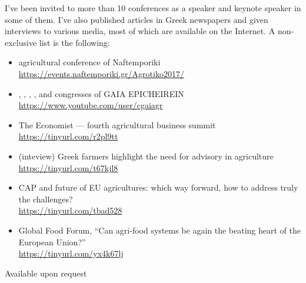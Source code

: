 \documentclass[10pt,a4paper]{article} %
\begin{document}
I've been invited to more than 10 conferences as a speaker and keynote speaker in some of them. I've also published
articles in Greek newspapers and given interviews to various media, most of which are available on the Internet.
A non-exclusive list is the following:
\begin{itemize}
\item {} agricultural conference of Naftemporiki \href{https://events.naftemporiki.gr/Agrotiko2017/}{https://events.naftemporiki.gr/Agrotiko2017/}
\item {}, , , ,  and  congresses of GAIA EPICHEIREIN \href{https://www.youtube.com/user/cgaiagr}{https://www.youtube.com/user/cgaiagr}
\item The Economist --- fourth agricultural business summit \href{http://www.hazliseconomist.com/gr/event/Fourth_Agricultural_Business_Summit}{https://tinyurl.com/r2pl9tt}
\item (inteview) Greek farmers highlight the need for advisory in agriculture
  \href{https://www.euractiv.com/section/agriculture-food/news/greek-farmers-highlight-the-need-for-advisory-in-agriculture/}{https://tinyurl.com/t67kjl8}
\item CAP and future of EU agricultures: which way forward, how to address truly the challenges?\\
  \href{https://www.farm-europe.eu/evenement/page/2/}{https://tinyurl.com/tbad528}
\item Global Food Forum, ``Can agri-food systems be again the beating heart of the European Union?''\\
  \href{https://www.farm-europe.eu/evenement/global-food-forum-2018-2/}{https://tinyurl.com/yx4k67lj}
\end{itemize}



\spacedhrule{1.6em}{-0.4em} %


Available upon request
\end{document}
